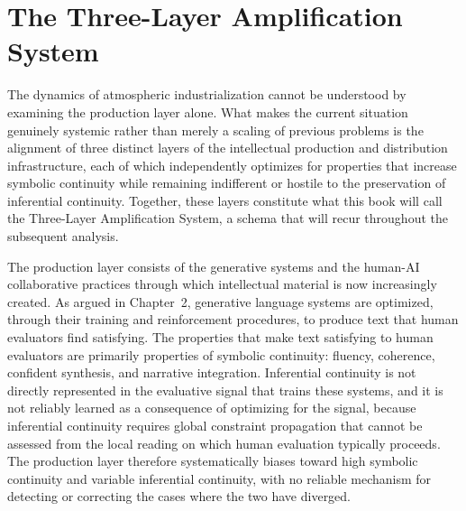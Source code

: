 \documentclass[12pt, openright, twoside]{book}
\begin{document}
\section{The Three-Layer Amplification System}

The dynamics of atmospheric industrialization cannot be understood
by examining the production layer alone. What makes the current
situation genuinely systemic rather than merely a scaling of previous
problems is the alignment of three distinct layers of the intellectual
production and distribution infrastructure, each of which independently
optimizes for properties that increase symbolic continuity while
remaining indifferent or hostile to the preservation of inferential
continuity. Together, these layers constitute what this book will
call the Three-Layer Amplification System, a schema that will
recur throughout the subsequent analysis.

The production layer consists of the generative systems and the
human-AI collaborative practices through which intellectual material
is now increasingly created. As argued in Chapter~2, generative
language systems are optimized, through their training and
reinforcement procedures, to produce text that human evaluators
find satisfying. The properties that make text satisfying to human
evaluators are primarily properties of symbolic continuity: fluency,
coherence, confident synthesis, and narrative integration. Inferential
continuity is not directly represented in the evaluative signal that
trains these systems, and it is not reliably learned as a consequence
of optimizing for the signal, because inferential continuity requires
global constraint propagation that cannot be assessed from the local
reading on which human evaluation typically proceeds. The production
layer therefore systematically biases toward high symbolic continuity
and variable inferential continuity, with no reliable mechanism for
detecting or correcting the cases where the two have diverged.
\end{document}
